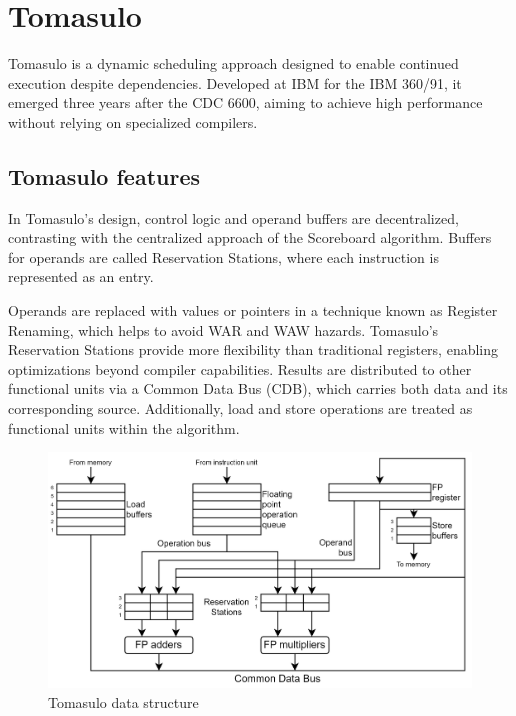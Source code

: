 \section{Tomasulo}

Tomasulo is a dynamic scheduling approach designed to enable continued execution despite dependencies.
Developed at IBM for the IBM 360/91, it emerged three years after the CDC 6600, aiming to achieve high performance without relying on specialized compilers.

\subsection{Tomasulo features}
In Tomasulo's design, control logic and operand buffers are decentralized, contrasting with the centralized approach of the Scoreboard algorithm. 
Buffers for operands are called Reservation Stations, where each instruction is represented as an entry.

Operands are replaced with values or pointers in a technique known as Register Renaming, which helps to avoid WAR and WAW hazards. 
Tomasulo's Reservation Stations provide more flexibility than traditional registers, enabling optimizations beyond compiler capabilities.
Results are distributed to other functional units via a Common Data Bus (CDB), which carries both data and its corresponding source. 
Additionally, load and store operations are treated as functional units within the algorithm.
\begin{figure}[H]
    \centering
    \includegraphics[width=0.75\linewidth]{images/tomasulo.png}
    \caption{Tomasulo data structure}
\end{figure}

